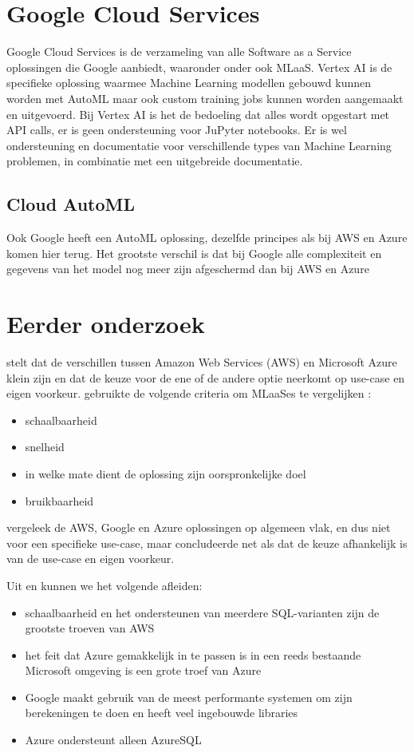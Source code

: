\section{Google Cloud Services}
Google Cloud Services is de verzameling van alle Software as a Service oplossingen die Google aanbiedt, waaronder onder ook MLaaS. Vertex AI is de specifieke oplossing waarmee Machine Learning modellen gebouwd kunnen worden met AutoML maar ook custom training jobs kunnen worden aangemaakt en uitgevoerd. Bij Vertex AI is het de bedoeling dat alles wordt opgestart met API calls, er is geen ondersteuning voor JuPyter notebooks. Er is wel ondersteuning en documentatie voor verschillende types van Machine Learning problemen, in combinatie met een uitgebreide documentatie. 

\subsection{Cloud AutoML}
Ook Google heeft een AutoML oplossing, dezelfde principes als bij AWS en Azure komen hier terug. Het grootste verschil is dat bij Google alle complexiteit en gegevens van het model nog meer zijn afgeschermd dan bij AWS en Azure \autocite{Xin2021}

\section{Eerder onderzoek}
\textcite{Madhuri2016} stelt dat de verschillen tussen Amazon Web Services (AWS) en Microsoft Azure klein zijn en dat de keuze voor de ene of de andere optie neerkomt op use-case en eigen voorkeur. \textcite{Pinto2018} gebruikte de volgende criteria om MLaaSes te vergelijken :
\begin{itemize}
    \item schaalbaarheid
    \item snelheid
    \item in welke mate dient de oplossing zijn oorspronkelijke doel
    \item bruikbaarheid
\end{itemize}
\textcite{Pallavi2020} vergeleek de AWS, Google en Azure oplossingen op algemeen vlak, en dus niet voor een specifieke use-case, maar concludeerde net als \textcite{Madhuri2016} dat de keuze afhankelijk is van de use-case en eigen voorkeur.

Uit \textcite{Pallavi2020} en \textcite{Madhuri2016} kunnen we het volgende afleiden: 
\begin{itemize}
    \item schaalbaarheid en het ondersteunen van meerdere SQL-varianten zijn de grootste troeven van AWS
    \item het feit dat Azure gemakkelijk in te passen is in een reeds bestaande Microsoft omgeving is een grote troef van Azure
    \item Google maakt gebruik van de meest performante systemen om zijn berekeningen te doen en heeft veel ingebouwde libraries
    \item Azure ondersteunt alleen AzureSQL
\end{itemize}

